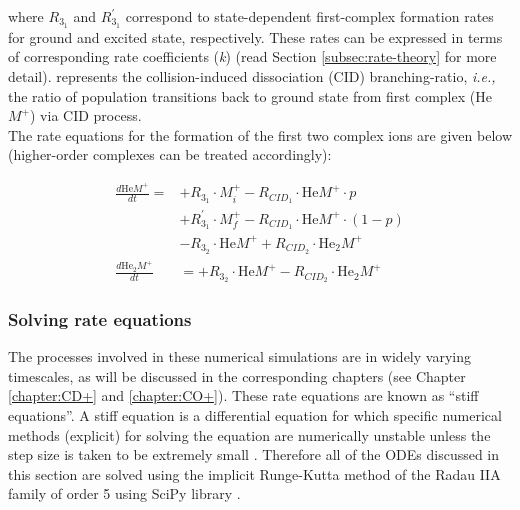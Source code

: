 where $R_{3_1}$ and $R^{'}_{3_1}$ correspond to state-dependent first-complex formation rates for ground and excited state, respectively. These rates can be expressed in terms of corresponding rate coefficients (\emph{k}) (read Section \ref{subsec:rate-theory} for more detail).  represents the collision-induced dissociation (CID) branching-ratio, \emph{i.e.,} the ratio of population transitions back to ground state from first complex (He$M^+$) via CID process.\\


The rate equations for the formation of the first two complex ions are given below (higher-order complexes can be treated accordingly):

\begin{equation*} \label{eq1}
    \begin{split}
        \frac{d\text{He}M^+}{dt} = 
            & +R_{3_1} \cdot M^+_i - R_{CID_1} \cdot \text{He}M^+ \cdot p \\
            &  +R^{'}_{3_1} \cdot M^+_f - R_{CID_1} \cdot \text{He}M^+ \cdot (1-p) \\
            & -R_{3_2} \cdot \text{He}M^+ + R_{CID_2} \cdot \text{He}_2M^+ \\
        \frac{d\text{He}_{2}M^+}{dt}
            &= +R_{3_2} \cdot \text{He}M^+ - R_{CID_2} \cdot \text{He}_{2}M^+
    \end{split}
\end{equation*}

\subsubsection{Solving rate equations}

The processes involved in these numerical simulations are in widely varying timescales, as will be discussed in the corresponding chapters (see Chapter \ref{chapter:CD+} and \ref{chapter:CO+}). These rate equations are known as \enquote{stiff equations}. A stiff equation is a differential equation for which specific numerical methods  (explicit) for solving the equation are numerically unstable unless the step size is taken to be extremely small \cite{hairer_solving_1991}.  Therefore all of the ODEs discussed in this section are solved using the implicit Runge-Kutta method of the Radau IIA family of order 5 \cite{hairer_implementation_1996} using SciPy library \cite{virtanen_scipy_2020}.